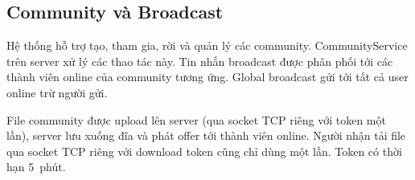 \subsection{Community và Broadcast}

Hệ thống hỗ trợ tạo, tham gia, rời và quản lý các community. CommunityService trên server xử lý các thao tác này. Tin nhắn broadcast được phân phối tới các thành viên online của community tương ứng. Global broadcast gửi tới tất cả user online trừ người gửi.

File community được upload lên server (qua socket TCP riêng với token một lần), server lưu xuống đĩa và phát offer tới thành viên online. Người nhận tải file qua socket TCP riêng với download token cũng chỉ dùng một lần. Token có thời hạn 5~phút.

\endgroup
